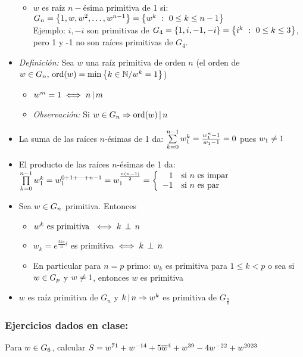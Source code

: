 \documentclass[12pt,a4paper, spanish]{article}
\begin{document}
\begin{itemize}
\begin{itemize}
		      \item $w$ es raíz $n-$ésima primitiva de 1 si:
		            $G_n = \set{1,w,w^2,\dots,w^{n-1}} =
			            \set{w^k\ :\ 0\leq k \leq n-1}$\\
		            Ejemplo: $i, -i$ son primitivas de $G_4 = \set{1,i,-1,-i} = \set{i^k\ :\ 0 \leq k \leq 3}$, pero 1 y -1 no son raíces primitivas de $G_4$.
	      \end{itemize}
	\item \textit{Definición: }
	      Sea $w$ una raíz primitiva de orden $n$ (el orden de
	      $w \en G_n,\, \text{ord}(w) = \text{min}\set{k \en \naturales / w^k = 1}$)
	      \begin{itemize}
		      \item $w^m = 1 \sisolosi n \divideA m$
		      \item \textit{Observación: } Si $w \en G_n \entonces \ord(w) \divideA n$
	      \end{itemize}
	\item La suma de las raíces $n$-ésimas de 1 da:
	      $\sumatoria{k=0}{n-1}w_1^k = \frac{w_1^n -1}{w_1 -1} = 0$ pues $w_1 \distinto 1$
	\item El producto de las raíces $n$-ésimas de 1 da:
	      $\productoria{k=0}{n-1} w_1^k = w_1^{0+1+\dots + n-1} =
		      w_1^{\frac{n(n-1)}{2}} =
		      \llave{rl}{
			      1 & \text{si $n$ es impar}\\
			      -1 & \text{si $n$ es par}
		      }$
	\item Sea $w \en G_n$ primitiva. Entonces
	      \begin{itemize}
		      \item $w^k \text{ es primitiva } \sisolosi k \cop n $
		      \item $w_k = e^{\frac{2k\pi}{n}i}$ es primitiva $\sisolosi k \cop n$
		      \item En particular para $n = p$ primo: $w_k$ es primitiva para $1\leq k < p$ o sea si
		            $w \en G_p$ y $w \distinto 1$, entonces $w$ es primitiva
	      \end{itemize}
	\item $w$ es raíz primitiva de $G_n$ y $k \divideA n \entonces w^k$ es primitiva de $G_\frac{n}{k}$
\end{itemize}

\subsubsection*{Ejercicios dados en clase:}
\ejercicio
Para $w \en G_6$, calcular $S = w^{71} + w^{-14} + 5\conj w^4 + w^{39} - 4w^{-22} + w^{2023}$
\end{document}

